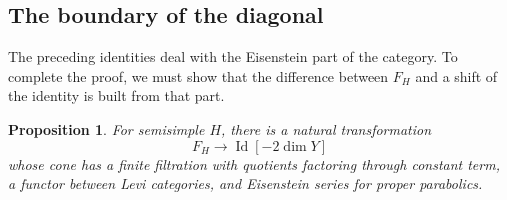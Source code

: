 \documentclass[11pt]{article}
\numberwithin{equation}{section}
\newtheorem{proposition}[theorem]{Proposition}
\theoremstyle{definition}
\theoremstyle{remark}
\begin{document}
\subsection{The boundary of the diagonal}

The preceding identities deal with the Eisenstein part of the category.
To complete the proof, we must show that the difference between $F_H$ and
a shift of the identity is built from that part.

\begin{proposition}\label{pseudo:boundary-factorization}
For semisimple $H$, there is a natural transformation
\[
 F_H\longrightarrow\operatorname{Id}[-2\dim Y]
\]
whose cone has a finite filtration with quotients factoring through constant
term, a functor between Levi categories, and Eisenstein series for proper
parabolics.
\end{proposition}
\end{document}
